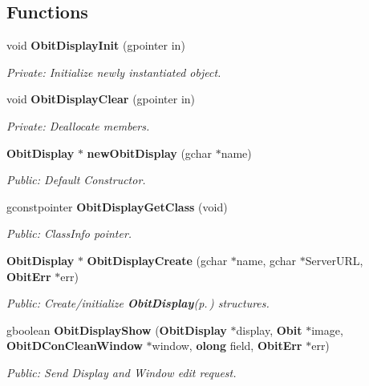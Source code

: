 \subsection*{Functions}
\begin{CompactItemize}
\item 
void {\bf Obit\-Display\-Init} (gpointer in)
\begin{CompactList}\small\item\em Private: Initialize newly instantiated object. \item\end{CompactList}\item 
void {\bf Obit\-Display\-Clear} (gpointer in)
\begin{CompactList}\small\item\em Private: Deallocate members. \item\end{CompactList}\item 
{\bf Obit\-Display} $\ast$ {\bf new\-Obit\-Display} (gchar $\ast$name)
\begin{CompactList}\small\item\em Public: Default Constructor. \item\end{CompactList}\item 
gconstpointer {\bf Obit\-Display\-Get\-Class} (void)
\begin{CompactList}\small\item\em Public: Class\-Info pointer. \item\end{CompactList}\item 
{\bf Obit\-Display} $\ast$ {\bf Obit\-Display\-Create} (gchar $\ast$name, gchar $\ast$Server\-URL, {\bf Obit\-Err} $\ast$err)
\begin{CompactList}\small\item\em Public: Create/initialize {\bf Obit\-Display}{\rm (p.\,\pageref{structObitDisplay})} structures. \item\end{CompactList}\item 
gboolean {\bf Obit\-Display\-Show} ({\bf Obit\-Display} $\ast$display, {\bf Obit} $\ast$image, {\bf Obit\-DCon\-Clean\-Window} $\ast$window, {\bf olong} field, {\bf Obit\-Err} $\ast$err)
\begin{CompactList}\small\item\em Public: Send Display and Window edit request. \item\end{CompactList}\item 

\end{CompactItemize}
